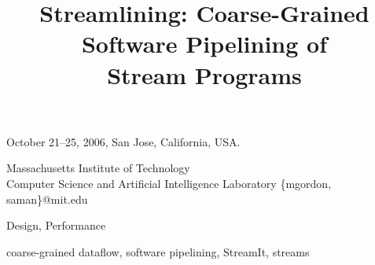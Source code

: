 \documentclass[preprint]{sigplanconf}
\begin{document}
 {October 21--25, 2006, San Jose, California, USA.} 


\title{Streamlining: Coarse-Grained Software Pipelining of \\Stream Programs}

           {Massachusetts Institute of Technology\\
	    Computer Science and Artificial Intelligence Laboratory}
           {\{mgordon, saman\}@mit.edu}

\maketitle

\begin{abstract}

\end{abstract}


\terms
Design, Performance

\keywords
coarse-grained dataflow, software pipelining, StreamIt, streams







{\small
{

}
}

\end{document}
